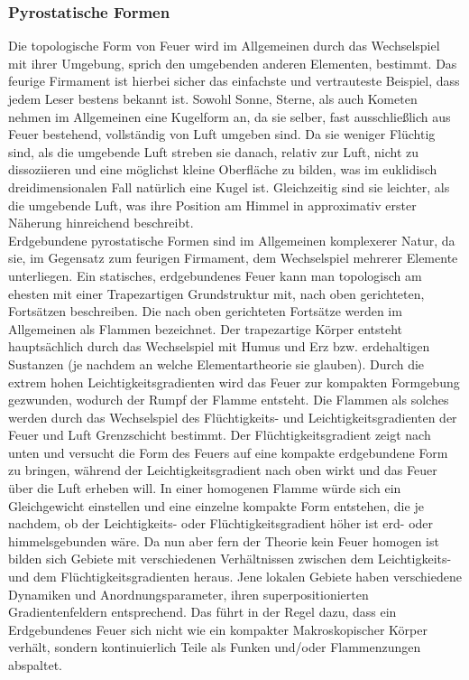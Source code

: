\documentclass[a5paper,8pt]{book}
\begin{document}
\subsubsection{Pyrostatische Formen}

Die topologische Form von Feuer wird im Allgemeinen durch das Wechselspiel mit ihrer Umgebung, sprich den umgebenden anderen 
Elementen, bestimmt.
Das feurige Firmament ist hierbei sicher das einfachste und vertrauteste Beispiel, dass jedem Leser bestens bekannt ist. 
Sowohl Sonne, Sterne, als auch Kometen nehmen im Allgemeinen eine Kugelform an, da sie selber, fast ausschließlich aus 
Feuer bestehend, vollständig von Luft umgeben sind. Da sie weniger Flüchtig sind, als die umgebende Luft streben sie 
danach, relativ zur Luft, nicht zu dissoziieren und eine möglichst kleine Oberfläche zu bilden, was im euklidisch 
dreidimensionalen Fall natürlich eine Kugel ist.
Gleichzeitig sind sie leichter, als die umgebende Luft, was ihre Position am Himmel in approximativ erster Näherung 
hinreichend beschreibt.\\

Erdgebundene pyrostatische Formen sind im Allgemeinen komplexerer Natur, da sie, im Gegensatz zum feurigen Firmament, 
dem Wechselspiel mehrerer Elemente unterliegen. Ein statisches, erdgebundenes Feuer kann man topologisch am ehesten mit 
einer Trapezartigen Grundstruktur mit, nach oben gerichteten, Fortsätzen beschreiben. Die nach oben gerichteten Fortsätze 
werden im Allgemeinen als Flammen bezeichnet.
Der trapezartige Körper entsteht hauptsächlich durch das Wechselspiel mit Humus und Erz bzw. erdehaltigen Sustanzen (je 
nachdem an welche Elementartheorie sie glauben). Durch die extrem hohen Leichtigkeitsgradienten wird das Feuer zur 
kompakten Formgebung gezwunden, wodurch der Rumpf der Flamme entsteht. Die Flammen als solches werden durch das 
Wechselspiel des Flüchtigkeits- und Leichtigkeitsgradienten der Feuer und Luft Grenzschicht bestimmt. Der 
Flüchtigkeitsgradient zeigt nach unten und versucht die Form des Feuers auf eine kompakte erdgebundene Form zu bringen, 
während der Leichtigkeitsgradient nach oben wirkt und das Feuer über die Luft erheben will. In einer homogenen Flamme 
würde sich ein Gleichgewicht einstellen und eine einzelne kompakte Form entstehen, die je nachdem, ob der Leichtigkeits- oder 
Flüchtigkeitsgradient höher ist erd- oder himmelsgebunden wäre.
Da nun aber fern der Theorie kein Feuer homogen ist bilden sich Gebiete mit verschiedenen Verhältnissen zwischen dem 
Leichtigkeits- und dem Flüchtigkeitsgradienten heraus. Jene lokalen Gebiete haben verschiedene Dynamiken und 
Anordnungsparameter, ihren superpositionierten Gradientenfeldern entsprechend.
Das führt in der Regel dazu, dass ein Erdgebundenes Feuer sich nicht wie ein kompakter Makroskopischer Körper verhält, 
sondern kontinuierlich Teile als Funken und/oder Flammenzungen abspaltet.
\end{document}
